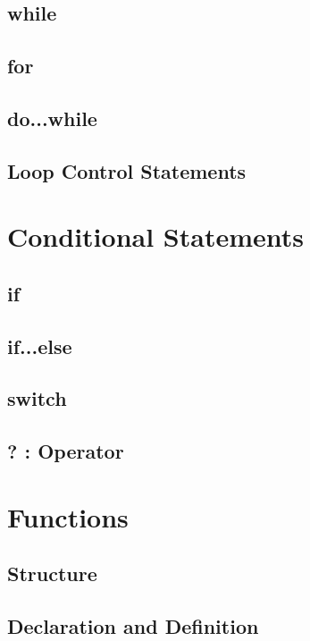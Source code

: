 \documentclass[10pt,a4paper]{scrartcl}
\begin{document}
\begin{multicols*}{2}
\subsection{while}

\subsection{for}

\subsection{do...while}

\subsection{Loop Control Statements}

\section{Conditional Statements}

\subsection{if}

\subsection{if...else}

\subsection{switch}

\subsection{? : Operator}

\section{Functions}

\subsection{Structure}

\subsection{Declaration and Definition}


\end{multicols*}
\end{document}
